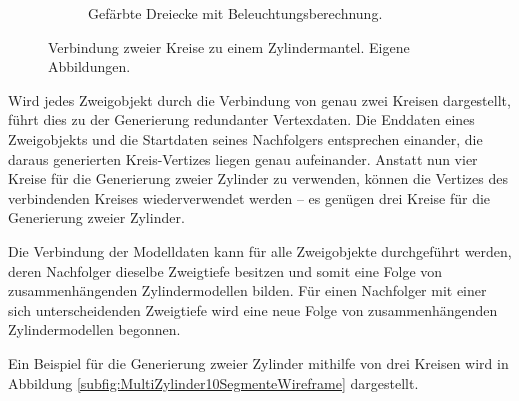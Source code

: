 \begin{figure} [hbtp]
\begin{subfigure}[t]{.4\textwidth}
	\caption{Gefärbte Dreiecke mit Beleuchtungsberechnung.}
	\label{subfig:Zylinder10SegmenteOpaque}
\end{subfigure}
\caption{Verbindung zweier Kreise zu einem Zylindermantel. Eigene Abbildungen.}
\label{fig:Zylinder10Segmente}
\end{figure}

Wird jedes Zweigobjekt durch die Verbindung von genau zwei Kreisen dargestellt, führt dies zu der Generierung redundanter Vertexdaten. Die Enddaten eines Zweigobjekts und die Startdaten seines Nachfolgers entsprechen einander, die daraus generierten Kreis-Vertizes liegen genau aufeinander. Anstatt nun vier Kreise für die Generierung zweier Zylinder zu verwenden, können die Vertizes des verbindenden Kreises wiederverwendet werden -- es genügen drei Kreise für die Generierung zweier Zylinder.

Die Verbindung der Modelldaten kann für alle Zweigobjekte durchgeführt werden, deren Nachfolger dieselbe Zweigtiefe besitzen und somit eine Folge von zusammenhängenden Zylindermodellen bilden. Für einen Nachfolger mit einer sich unterscheidenden Zweigtiefe wird eine neue Folge von zusammenhängenden Zylindermodellen begonnen. \cite{ModelingByNumbersZylindersA:13}

Ein Beispiel für die Generierung zweier Zylinder mithilfe von drei Kreisen wird in Abbildung \ref{subfig:MultiZylinder10SegmenteWireframe} dargestellt.

